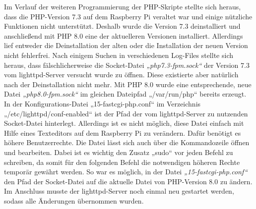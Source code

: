 Im Verlauf der weiteren Programmierung der PHP-Skripte stellte sich heraus, dass die PHP-Version 7.3 auf dem Raspberry Pi veraltet war und einige nützliche Funktionen nicht unterstützt. Deshalb wurde die Version 7.3 deinstalliert und anschließend mit PHP 8.0 eine der aktuelleren Versionen installiert. Allerdings lief entweder die Deinstallation der alten oder die Installation der neuen Version nicht fehlerfrei. Nach einigem Suchen in verschiedenen Log-Files stellte sich heraus, dass fälschlicherweise die Socket-Datei \textit{„php7.3-fpm.sock“} der Version 7.3 vom lighttpd-Server versucht wurde zu öffnen. Diese existierte aber natürlich nach der Deinstallation nicht mehr. Mit PHP 8.0 wurde eine entsprechende, neue Datei \textit{„php8.0-fpm.sock“} im gleichen Dateipfad „/var/run/php“ bereits erzeugt. In der Konfigurations-Datei „15-fastcgi-php.conf“ im Verzeichnis „/etc/lighttpd/conf-enabled“ ist der Pfad der vom lighttpd-Server zu nutzenden Socket-Datei hinterlegt. Allerdings ist es nicht möglich, diese Datei einfach mit Hilfe eines Texteditors auf dem Raspberry Pi zu verändern. Dafür benötigt es höhere Benutzerrechte. Die Datei lässt sich auch über die Kommandozeile öffnen und bearbeiten. Dabei ist es wichtig den Zusatz „sudo“ vor jeden Befehl zu schreiben, da somit für den folgenden Befehl die notwendigen höheren Rechte temporär gewährt werden. So war es möglich, in der Datei \textit{„15-fastcgi-php.conf“} den Pfad der Socket-Datei auf die aktuelle Datei von PHP-Version 8.0 zu ändern. Im Anschluss musste der lighttpd-Server noch einmal neu gestartet werden, sodass alle Änderungen übernommen wurden.

